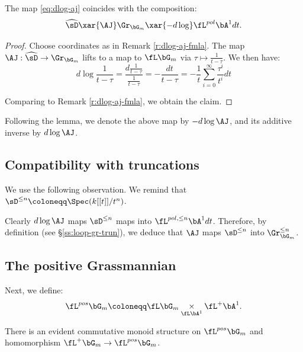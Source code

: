 \begin{lem}
\notready\label{l:dlog-aj}

The map \eqref{eq:dlog-aj} coincides with the composition:
%
\[
\widehat{\sD} \xar{\AJ} \Gr_{\bG_m}
\xar{-d\log} \fL^{pol} \bA^1 dt.
\]

\end{lem}

\begin{proof}

Choose coordinates as in Remark \ref{r:dlog-aj-fmla}.
The map $\AJ:\widehat{\sD} \to \Gr_{\bG_m}$ lifts to a
map to $\fL\bG_m$ via $\tau \mapsto \frac{1}{t-\tau}$.
We then have:
%
\[
d\log \frac{1}{t-\tau} =
\frac{d\frac{1}{t-\tau}}{\frac{1}{t-\tau}} =
-\frac{dt}{t-\tau} = -\frac{1}{t}\sum_{i = 0}^{\infty} \frac{\tau^i}{t^i} dt
\]

 Comparing to Remark \ref{r:dlog-aj-fmla}, we obtain the
claim.

\end{proof}

\begin{rem}
\notready

Following the lemma, we denote the above map by
$-d\log \AJ$, and its additive inverse by $d\log \AJ$.

\end{rem}


\subsection{Compatibility with truncations}\label{ss:aj-trun}

We use the following observation. We remind that
$\sD^{\leq n} \coloneqq \Spec(k[[t]]/t^n)$.

Clearly $d\log \AJ$ maps $\sD^{\leq n}$ maps
into $\fL^{pol,\leq n} \bA^1 dt$.
Therefore, by definition (see \S \ref{ss:loop-gr-trun}),
we deduce that $\AJ$ maps $\sD^{\leq n}$ into
$\Gr_{\bG_m}^{\leq n}$.

\subsection{The positive Grassmannian}\label{ss:pos-gr}

Next, we define:
%
\[
\fL^{pos} \bG_m \coloneqq
\fL \bG_m \underset{\fL \bA^1} {\times} \fL^+ \bA^1.
\]

 There is an evident commutative monoid
structure on $\fL^{pos} \bG_m$ and homomorphism
$\fL^+ \bG_m \to \fL^{pos} \bG_m$.

